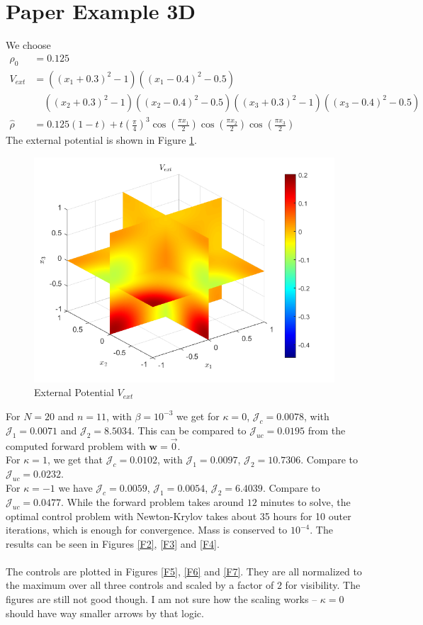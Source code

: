 \documentclass[11pt, a4paper]{article}
\theoremstyle{definition}
\newcommand{\w}{\mathbf{w}}
\newcommand{\hr}{\widehat \rho}
\begin{document}
	\section*{Paper Example 3D}
	We choose 
	\begin{align*}
		\rho_0 &= 0.125\\
		V_{ext} &= ((x_1 + 0.3)^2 - 1)((x_1 - 0.4)^2 - 0.5)\\
		&\quad ((x_2 + 0.3)^2 - 1)((x_2 - 0.4)^2 - 0.5)((x_3 + 0.3)^2 - 1)((x_3 - 0.4)^2 - 0.5)\\
		\hr &= 0.125(1-t) + t\left(\frac{\pi}{4}\right)^3\cos\left(\frac{\pi x_1}{2}\right)\cos\left(\frac{\pi x_2}{2}\right)\cos\left(\frac{\pi x_3}{2}\right)
	\end{align*}
	The external potential is shown in Figure \ref{F1}.
	\begin{figure}[h]
		\centering
		\includegraphics[scale=0.7]{Vext3D.png}
		\caption{External Potential $V_{ext}$} 
		\label{F1}
	\end{figure}
	
	For $N = 20$ and $n = 11$, with $\beta = 10^{-3}$ we get for $\kappa = 0$, $\mathcal J_c = 0.0078$, with $\mathcal J_1 = 0.0071$ and $\mathcal J_2 = 8.5034$.
	This can be compared to $\mathcal J_{uc} = 0.0195$ from the computed forward problem with $\w = \vec 0$.\\
	For $\kappa = 1$, we get that $\mathcal J_c = 0.0102$, with $\mathcal J_1 = 0.0097$, $\mathcal J_2 = 10.7306$. Compare to $\mathcal J_{uc} = 0.0232$. \\
	For $\kappa = -1$ we have $\mathcal J_c = 0.0059$, $\mathcal J_1 = 0.0054$, $\mathcal J_2 = 6.4039$. Compare to $\mathcal J_{uc} = 0.0477$.
	While the forward problem takes around $12$ minutes to solve, the optimal control problem with Newton-Krylov takes about 35 hours for 10 outer iterations, which is enough for convergence. Mass is conserved to $10^{-4}$. The results can be seen in Figures \ref{F2}, \ref{F3} and \ref{F4}. 
	\\
	\\
	The controls are plotted in Figures \ref{F5}, \ref{F6} and \ref{F7}. They are all normalized to the maximum over all three controls and scaled by a factor of $2$ for visibility. The figures are still not good though. I am not sure how the scaling works -- $\kappa = 0$ should have way smaller arrows by that logic.
\end{document}
